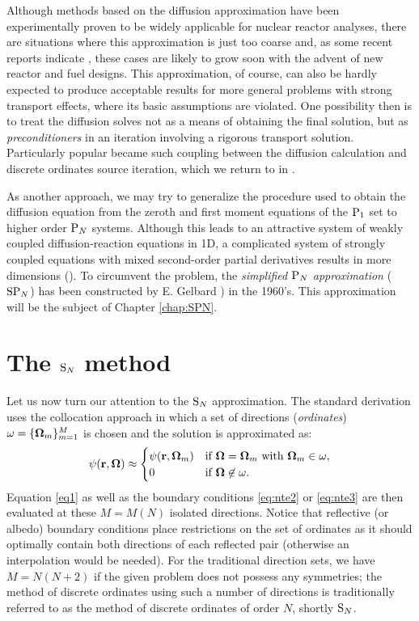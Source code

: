 Although methods based on the diffusion approximation have been experimentally proven to be widely applicable for
nuclear reactor analyses, there are situations where this approximation is just too coarse and, as some recent reports
indicate \cite{Hejzlar1,Cho1}, these cases are likely to grow soon with the advent of new reactor and fuel designs.
This approximation, of course, can also be hardly expected to produce acceptable results for more general problems with
strong transport effects, where its basic assumptions are violated. One possibility then is to treat the diffusion
solves not as a means of obtaining the final solution, but as \textit{preconditioners} in an iteration involving a
rigorous transport solution. Particularly popular became such coupling between the diffusion calculation and discrete
ordinates source iteration, which we return to in .

As another approach, we may try to generalize
the procedure used to obtain the diffusion equation from the zeroth and first moment equations of the $\PN[1]$ set to
higher order $\PN$ systems.
Although this leads to an attractive system of weakly coupled diffusion-reaction equations in 1D, a complicated system
of strongly coupled equations with mixed second-order partial derivatives results in more dimensions (\cite{Capilla}).
To circumvent the problem, the \textit{simplified $\PN$ approximation} ($\SPN$) has been constructed by E. Gelbard
\cite{Gelbard1,Gelbard2}) in the 1960's. This approximation will be the subject of Chapter \ref{chap:SPN}.

\section{The $\SN$ method}\label{sec:1-SN}
Let us now turn our attention to the $\SN$ approximation. The standard derivation uses the
collocation approach in which a set of directions (\textit{ordinates}) 
\mbox{$\omega = \{\bomega_m\}_{m=1}^{M}$} is chosen and the solution is approximated as:
\begin{equation}\label{eq:sn_approx} 
	\psi(\br, \bomega) \approx 
		\pw{\psi(\br,\bomega_m)}{if $\bomega = \bomega_m$ with $\bomega_m \in \omega$}
		   {0}{if $\bomega \not \in \omega$.} 
\end{equation}
Equation \eqref{eq1} as well as the boundary conditions \eqref{eq:nte2} or \eqref{eq:nte3} are then evaluated at these
$M = M(N)$ isolated directions. Notice that reflective (or albedo) boundary conditions place restrictions on the set of
ordinates as it should optimally contain both directions of each reflected pair (otherwise an interpolation would be
needed). For the traditional direction sets, we have $M = N(N+2)$ if the given problem does not possess any symmetries;
the method of discrete ordinates using such a number of directions is traditionally referred to as the method of 
discrete ordinates of order $N$, shortly $\SN$.


